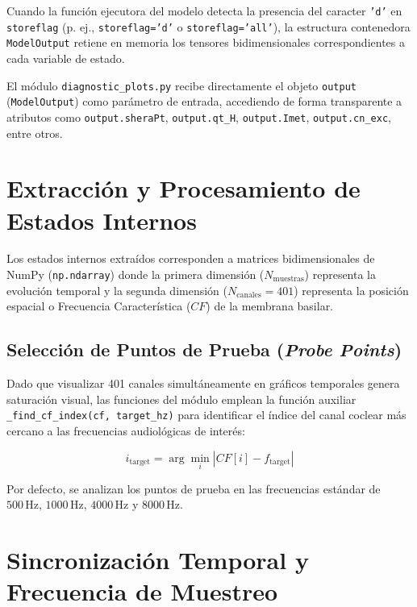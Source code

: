 \documentclass[12pt,a4paper]{article}
\begin{document}
Cuando la función ejecutora del modelo detecta la presencia del caracter \texttt{'d'} en \texttt{storeflag} (p. ej., \texttt{storeflag='d'} o \texttt{storeflag='all'}), la estructura contenedora \texttt{ModelOutput} retiene en memoria los tensores bidimensionales correspondientes a cada variable de estado. 

El módulo \texttt{diagnostic\_plots.py} recibe directamente el objeto \texttt{output} (\texttt{ModelOutput}) como parámetro de entrada, accediendo de forma transparente a atributos como \texttt{output.sheraPt}, \texttt{output.qt\_H}, \texttt{output.Imet}, \texttt{output.cn\_exc}, entre otros.

\section{Extracción y Procesamiento de Estados Internos}

Los estados internos extraídos corresponden a matrices bidimensionales de NumPy (\texttt{np.ndarray}) donde la primera dimensión ($N_{\text{muestras}}$) representa la evolución temporal y la segunda dimensión ($N_{\text{canales}} = 401$) representa la posición espacial o Frecuencia Característica ($CF$) de la membrana basilar.

\subsection{Selección de Puntos de Prueba (\emph{Probe Points})}
Dado que visualizar 401 canales simultáneamente en gráficos temporales genera saturación visual, las funciones del módulo emplean la función auxiliar \texttt{\_find_cf_index(cf, target\_hz)} para identificar el índice del canal coclear más cercano a las frecuencias audiológicas de interés:

\begin{equation}
i_{\text{target}} = \arg\min_{i} \left| CF[i] - f_{\text{target}} \right|
\end{equation}

Por defecto, se analizan los puntos de prueba en las frecuencias estándar de $500\,\text{Hz}$, $1000\,\text{Hz}$, $4000\,\text{Hz}$ y $8000\,\text{Hz}$.

\section{Sincronización Temporal y Frecuencia de Muestreo}
\end{document}
